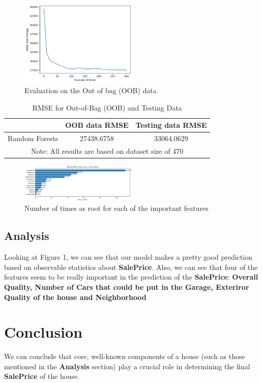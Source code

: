 \documentclass[a4paper,12pt]{article}
\begin{document}
\begin{figure}[] %
    \centering
    \includegraphics[width=0.5\textwidth]{./images/3.png} %
    \caption{Evaluation on the Out of bag (OOB) data}
\end{figure}

\begin{table}[htbp]
    \centering
    \caption{RMSE for Out-of-Bag (OOB) and Testing Data}
    \label{tab:classifiers}
    \begin{tabular}{lcc}
    \toprule
    & \textbf{OOB data RMSE} & \textbf{Testing data RMSE} \\
    \midrule
    Random Forests & 27438.6758 & 33064.0629 \\
    \bottomrule
    \multicolumn{3}{c}{\footnotesize Note: All results are based on dataset size of 470} \\
    \end{tabular}
\end{table}

\begin{figure}[] %
    \centering
    \includegraphics[width=0.5\textwidth]{./images/4.png} %
    \caption{Number of times as root for each of the important features}
\end{figure}


\subsection{Analysis}
Looking at Figure 1, we can see that our model makes a pretty good prediction based on observable statistics about \textbf{SalePrice}. Also, we can see that four of the features seem to be really important in the prediction of the \textbf{SalePrice}: \textbf{Overall Quality, Number of Cars that could be put in the Garage, Exteriror Quality of the house and Neighborhood}

\section{Conclusion}
We can conclude that core, well-known components of a house (such as those mentioned in the \textbf{Analysis} section) play a crucial role in determining the final \textbf{SalePrice} of the house.

\end{document}
